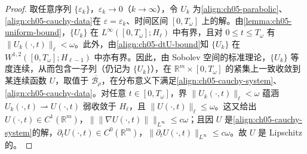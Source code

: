 \documentclass[../../main.tex]{subfiles}
\begin{document}
\begin{proof}
取任意序列 $\{\varepsilon_{k}\}$，$\varepsilon_{k}\to0$（$k\to\infty$），令 $U_{k}$ 为\eqref{align:ch05-parabolic}、\eqref{align:ch05-cauchy-data}在 $\varepsilon=\varepsilon_{k}$、时间区间 $[0,T_{\omega}]$ 上的解。由\cref{lemma:ch05-uniform-bound}，$\{U_{k}\}$ 在 $L^{\infty}([0,T_{\omega}];H_{\ell})$ 中有界，且对 $0\leqslant t\leqslant T_{\omega}$ 有 $\|U_{k}(\cdot,t)\|_{\ell}<\omega$。此外，由\eqref{align:ch05-dtU-bound}知 $\{U_{k}\}$ 在 $W^{1,2}([0,T_{\omega}];H_{\ell-1})$ 中亦有界。因此，由 Sobolev 空间的标准理论，$\{U_{k}\}$ 等度连续，从而包含一子列（仍记为 $\{U_{k}\}$），在 $\mathbb{R}^{m}\times[0,T_{\omega}]$ 的紧集上一致收敛到某连续函数 $U$，取值于 $\overline{\mathscr{B}_{\rho}}$，在分布意义下满足\eqref{align:ch05-cauchy-system}、\eqref{align:ch05-cauchy-data}。对任意 $t\in[0,T_{\omega}]$，界 $\|U_{k}(\cdot,t)\|_{\ell}<\omega$ 蕴涵 $U_{k}(\cdot,t)\rightharpoonup U(\cdot,t)$ 弱收敛于 $H_{\ell}$，且 $\|U(\cdot,t)\|_{\ell}\leqslant\omega$。这又给出 $U(\cdot,t)\in C^{1}(\mathbb{R}^{m})$，$\|\|\nabla U(\cdot,t)\|\|_{L^{\infty}}\leqslant c\omega$；且因 $U$ 是\eqref{align:ch05-cauchy-system}的解，$\partial_{t}U(\cdot,t)\in C^{0}(\mathbb{R}^{m})$，$\|\partial_{t}U(\cdot,t)\|_{L^{\infty}}\leqslant c\omega$。故 $U$ 是 Lipschitz 的。


\end{proof}
\end{document}
